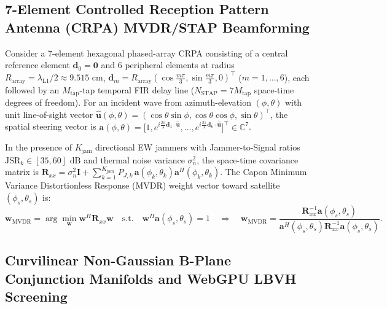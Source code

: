 \documentclass[11pt,a4paper]{article}
\theoremstyle{plain}
\theoremstyle{definition}
\theoremstyle{remark}
\begin{document}
\subsection{7-Element Controlled Reception Pattern Antenna (CRPA) MVDR/STAP Beamforming}

Consider a 7-element hexagonal phased-array CRPA consisting of a central reference element $\mathbf{d}_0 = \mathbf{0}$ and 6 peripheral elements at radius $R_{\text{array}} = \lambda_{\text{L1}}/2 \approx 9.515\text{ cm}$, $\mathbf{d}_m = R_{\text{array}}(\cos\frac{m\pi}{3}, \sin\frac{m\pi}{3}, 0)^\top$ ($m=1,\dots,6$), each followed by an $M_{\text{tap}}$-tap temporal FIR delay line ($N_{\text{STAP}} = 7 M_{\text{tap}}$ space-time degrees of freedom). For an incident wave from azimuth-elevation $(\phi, \theta)$ with unit line-of-sight vector $\hat{\mathbf{u}}(\phi,\theta) = (\cos\theta\sin\phi, \cos\theta\cos\phi, \sin\theta)^\top$, the spatial steering vector is $\mathbf{a}(\phi,\theta) = \bigl[1, e^{i\frac{2\pi}{\lambda}\mathbf{d}_1\cdot\hat{\mathbf{u}}}, \dots, e^{i\frac{2\pi}{\lambda}\mathbf{d}_6\cdot\hat{\mathbf{u}}}\bigr]^\top \in \mathbb{C}^7$.

In the presence of $K_{\text{jam}}$ directional EW jammers with Jammer-to-Signal ratios $\text{JSR}_k \in [35, 60]\text{ dB}$ and thermal noise variance $\sigma_n^2$, the space-time covariance matrix is $\mathbf{R}_{xx} = \sigma_n^2 \mathbf{I} + \sum_{k=1}^{K_{\text{jam}}} P_{J,k}\,\mathbf{a}(\phi_k,\theta_k)\mathbf{a}^H(\phi_k,\theta_k)$. The Capon Minimum Variance Distortionless Response (MVDR) weight vector toward satellite $(\phi_s, \theta_s)$ is:
\begin{equation}\label{eq:mvdr_weights}
  \mathbf{w}_{\text{MVDR}} = \arg\min_{\mathbf{w}} \mathbf{w}^H \mathbf{R}_{xx} \mathbf{w} \quad \text{s.t.} \quad \mathbf{w}^H \mathbf{a}(\phi_s, \theta_s) = 1 \quad \Longrightarrow \quad \mathbf{w}_{\text{MVDR}} = \frac{\mathbf{R}_{xx}^{-1}\mathbf{a}(\phi_s,\theta_s)}{\mathbf{a}^H(\phi_s,\theta_s)\mathbf{R}_{xx}^{-1}\mathbf{a}(\phi_s,\theta_s)}.
\end{equation}

\subsection{Curvilinear Non-Gaussian B-Plane Conjunction Manifolds and WebGPU LBVH Screening}
\end{document}
